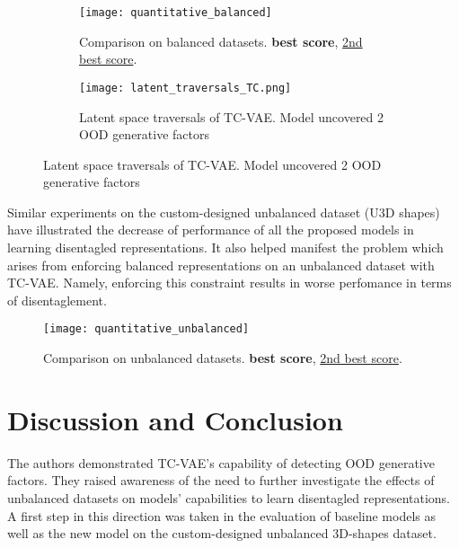 \documentclass[twoside,11pt]{article}
\begin{document}
\newpage

\begin{figure}[h]
  \captionsetup{justification=centering}
  \caption{Results on balanced datasets.}
  \captionsetup[subfigure]{justification=centering}
  \hfill
  \begin{subfigure}{0.48\textwidth}
    \texttt{[image: quantitative\_balanced]}
    \captionsetup{justification=centering}
    \caption{Comparison on balanced datasets. \textbf{best score}, \underline{2nd best score}.}
  \end{subfigure}
  \hfill
  \begin{subfigure}{0.48\textwidth}
    \texttt{[image: latent\_traversals\_TC.png]}
    \captionsetup{justification=centering}
    \caption{Latent space traversals of TC-VAE. Model uncovered 2 OOD generative factors}
    \centering
  \end{subfigure}
  \hfill
\end{figure}

Similar experiments on the custom-designed unbalanced dataset (U3D shapes) have illustrated the decrease of performance of all the proposed models in learning disentagled representations. It also helped manifest the problem which arises from enforcing balanced representations on an unbalanced dataset with TC-VAE. Namely, enforcing this constraint results in worse perfomance in terms of disentaglement.

\begin{figure}[h]
  \texttt{[image: quantitative\_unbalanced]}
  \captionsetup{justification=centering}
  \caption{Comparison on unbalanced datasets. \textbf{best score}, \underline{2nd best score}.}
  \centering
\end{figure}

\newpage
\section{Discussion and Conclusion}
The authors demonstrated TC-VAE's capability of detecting OOD generative factors. They raised awareness of the need to further investigate the effects of unbalanced datasets on models' capabilities to learn disentagled representations.
A first step in this direction was taken in the evaluation of baseline models as well as the new model on the custom-designed unbalanced 3D-shapes dataset.



\end{document}
